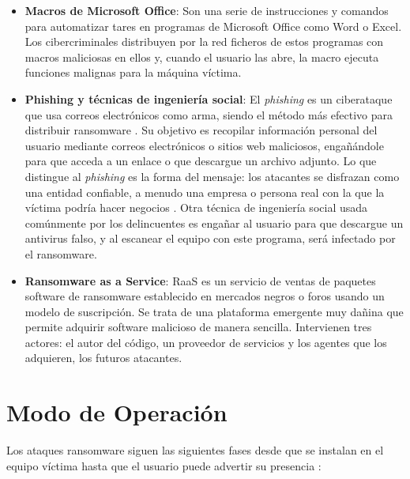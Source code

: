 \begin{itemize}
    \item \textbf{Macros de Microsoft Office}\label{item:macros}: Son una serie de instrucciones y comandos para automatizar tares en programas de Microsoft Office como Word o Excel. Los cibercriminales distribuyen por la red ficheros de estos programas con macros maliciosas en ellos y, cuando el usuario las abre, la macro ejecuta funciones malignas para la máquina víctima. 

    \item \textbf{Phishing y técnicas de ingeniería social}: El \textit{phishing} es un ciberataque que usa correos electrónicos como arma, siendo el método más efectivo para distribuir ransomware \cite{41}. Su objetivo es recopilar información personal del usuario mediante correos electrónicos o sitios web maliciosos, engañándole para que acceda a un enlace o que descargue un archivo adjunto. Lo que distingue al \textit{phishing} es la forma del mensaje: los atacantes se disfrazan como una entidad confiable, a menudo una empresa o persona real con la que la víctima podría hacer negocios \cite{42}. Otra técnica de ingeniería social usada comúnmente por los delincuentes es engañar al usuario para que descargue un antivirus falso, y al escanear el equipo con este programa, será infectado por el ransomware.

    \item \textbf{Ransomware as a Service}: \gls{RaaS} es un servicio de ventas de paquetes software de ransomware establecido en mercados negros o foros usando un modelo de suscripción. Se trata de una plataforma emergente muy dañina que permite adquirir software malicioso de manera sencilla. Intervienen tres actores: el autor del código, un proveedor de servicios y los agentes que los adquieren, los futuros atacantes.
    
\end{itemize}

\section{Modo de Operación}\label{sec:2-7}
\noindent Los ataques ransomware siguen las siguientes fases desde que se instalan en el equipo víctima hasta que el usuario puede advertir su presencia \cite{ransommasive}:

